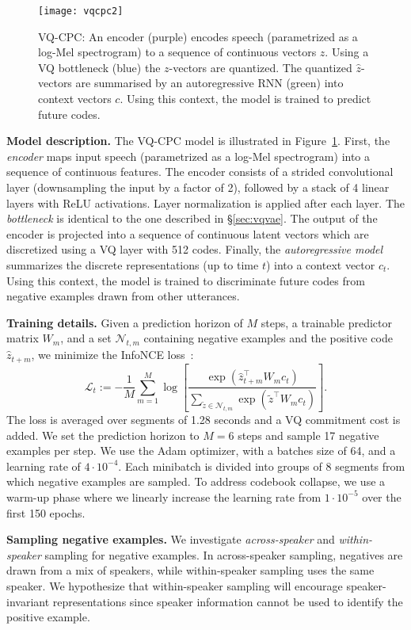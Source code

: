 \documentclass[a4paper]{article}
\newcommand{\imagesep}{\vspace*{-4pt}}
\begin{document}
\begin{figure}[!t]
    \centering
\texttt{[image: vqcpc2]}
    \imagesep
    \caption{
    VQ-CPC: An encoder (purple) encodes speech (parametrized as a log-Mel spectrogram) to a sequence of continuous vectors $z$. 
    Using a VQ bottleneck (blue) the $z$-vectors are quantized.
    The quantized $\hat{z}$-vectors are summarised by an autoregressive RNN (green) into context vectors $c$.
    Using this context, the model is trained to predict future codes.}
    \label{fig:vqcpc}
\end{figure}

\textbf{Model description.}
The VQ-CPC model is illustrated in Figure~\ref{fig:vqcpc}.
First, the \textit{encoder} maps input speech (parametrized as a log-Mel spectrogram) into a sequence of continuous features. 
The encoder consists of a strided convolutional layer (downsampling the input by a factor of 2), followed by a stack of 4 linear layers with ReLU activations.
Layer normalization is applied after each layer.
The \textit{bottleneck} is identical to the one described in \S\ref{sec:vqvae}. 
The output of the encoder is projected into a sequence of continuous latent vectors which are discretized using a VQ layer with 512 codes.
Finally, the \textit{autoregressive model} summarizes the discrete representations (up to time $t$) into a context vector $c_t$. 
Using this context, the model is trained to discriminate future codes from negative examples drawn from other utterances.


\textbf{Training details.}
Given a prediction horizon of $M$ steps, a trainable predictor matrix $W_m$, and a set $\mathcal{N}_{t,m}$  containing negative examples and the positive code $\hat{z}_{t+m}$, we minimize the InfoNCE loss~\cite{vandenoord+etal_arxiv18}:
\[
\mathcal{L}_t := - \frac{1}{M} \sum_{m=1}^M \log \left[ \frac{\exp(\hat{z}^\intercal_{t+m} W_m c_t)}{\sum_{\tilde{z} \in \mathcal{N}_{t,m}} \exp(\tilde{z}^\intercal W_m c_t)} \right].
\]
The loss is averaged over segments of 1.28 seconds and a VQ commitment cost is added.
We set the prediction horizon to $M = \textrm{6}$ steps and sample 17 negative examples per step.
We use the Adam optimizer, with a batches size of 64, and a learning rate of $4 \cdot 10^{-4}$. 
Each minibatch is divided into groups of 8 segments from which negative examples are sampled.
To address codebook collapse, we use a warm-up phase where we linearly increase the learning rate from $1 \cdot 10^{-5}$ over the first 150 epochs.


\textbf{Sampling negative examples.}
We investigate \textit{across-speaker} and \textit{within-speaker} sampling for negative examples.
In across-speaker sampling, negatives are drawn from a mix of speakers, while within-speaker sampling uses the same speaker.
We hypothesize that {within-speaker} sampling will encourage speaker-invariant representations since speaker information cannot be used to identify  the positive example.
\end{document}
